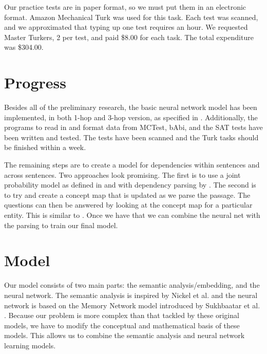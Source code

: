 \documentclass[pageno]{jpaper}
\begin{document}
Our practice tests are in paper format, so we must put them in an electronic
format. Amazon Mechanical Turk was used for this task. Each test was scanned,
and we approximated that typing up one test requires an hour. We requested
Master Turkers, 2 per test, and paid \$8.00 for each task. The total expenditure
was \$304.00.

\section{Progress} Besides all of the preliminary research, the basic neural
network model has been implemented, in both 1-hop and 3-hop version, as
specified in \cite{Sukhbaatar2015}. Additionally, the programs to read in and
format data from MCTest, bAbi, and the SAT tests have been written and tested.
The tests have been scanned and the Turk tasks should be finished within a week.

The remaining steps are to create a model for dependencies within sentences and
across sentences. Two approaches look promising. The first is to use a joint
probability model as defined in \cite{Narasimhan2015} and with dependency
parsing by \cite{Chen2014}. The second is to try and create a concept map that
is updated as we parse the passage. The questions can then be answered by
looking at the concept map for a particular entity. This is similar to
\cite{Bordes2015}. Once we have that we can combine the neural net with the
parsing to train our final model.

\section{Model}
\label{Model}

Our model consists of two main parts: the semantic analysis/embedding, and the
neural network. The semantic analysis is inspired by Nickel et al.
\cite{Nickel2011} and the neural network is based on the Memory Network model
introduced by Sukhbaatar et al. \cite{Sukhbaatar2015}. Because our problem is
more complex than that tackled by these original models, we have to modify the
conceptual and mathematical basis of these models. This allows us to combine the
semantic analysis and neural network learning models.
\end{document}
